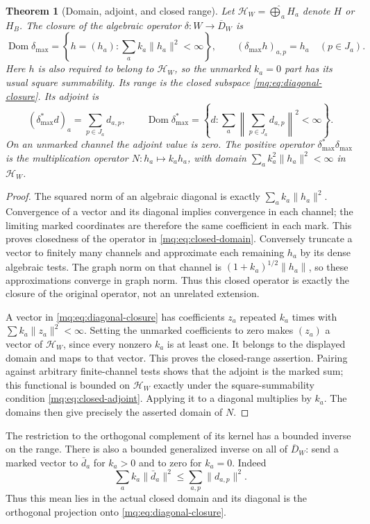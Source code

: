 \documentclass[11pt,a4paper]{article}
\newtheorem{theorem}{Theorem}[section]
\theoremstyle{definition}\newtheorem{definition}[theorem]{Definition}
\providecommand{\Dom}{\operatorname{Dom}}
\begin{document}
\begin{theorem}[Domain, adjoint, and closed range]
\label{mq:thm:closed-diagonal}
Let $\mathscr H_W=\widehat\bigoplus_aH_a$ denote $H$ or $H_B$.
The closure of the algebraic operator $\delta:W\to\overline D_W$
is
\[
 \Dom\delta_{\max}=
 \left\{h=(h_a):\sum_a k_a\|h_a\|^2<\infty\right\},
 \qquad(\delta_{\max}h)_{a,p}=h_a\quad(p\in J_a).
 \tag{MQ20}\label{mq:eq:closed-domain}
\]
Here $h$ is also required to belong to $\mathscr H_W$, so the
unmarked $k_a=0$ part has its usual square summability. Its range
is the closed subspace \eqref{mq:eq:diagonal-closure}. Its adjoint is
\[
 (\delta_{\max}^*d)_a=\sum_{p\in J_a}d_{a,p},\qquad
 \Dom\delta_{\max}^*=
 \left\{d:\sum_a\left\|\sum_{p\in J_a}d_{a,p}\right\|^2
                         <\infty\right\}.
 \tag{MQ21}\label{mq:eq:closed-adjoint}
\]
On an unmarked channel the adjoint value is zero. The positive
operator $\delta_{\max}^*\delta_{\max}$ is the multiplication
operator $N:h_a\mapsto k_ah_a$, with domain
$\sum_a k_a^2\|h_a\|^2<\infty$ in $\mathscr H_W$.
\end{theorem}
\begin{proof}
The squared norm of an algebraic diagonal is exactly
$\sum_a k_a\|h_a\|^2$. Convergence of a vector and its diagonal
implies convergence in each channel; the limiting marked
coordinates are therefore the same coefficient in each mark.
This proves closedness of the operator in
\eqref{mq:eq:closed-domain}. Conversely truncate a vector to finitely
many channels and approximate each remaining $h_a$ by its dense
algebraic tests. The graph norm on that channel is
$(1+k_a)^{1/2}\|h_a\|$, so these approximations converge in
graph norm. Thus this closed operator is exactly the closure of
the original operator, not an unrelated extension.

A vector in \eqref{mq:eq:diagonal-closure} has coefficients $z_a$
repeated $k_a$ times with $\sum k_a\|z_a\|^2<\infty$. Setting
the unmarked coefficients to zero makes $(z_a)$ a vector of
$\mathscr H_W$, since every nonzero $k_a$ is at least one.
It belongs to the displayed domain and maps to that vector.
This proves the closed-range assertion. Pairing against arbitrary
finite-channel tests shows that the adjoint is the marked sum;
this functional is bounded on $\mathscr H_W$ exactly under the
square-summability condition \eqref{mq:eq:closed-adjoint}. Applying
it to a diagonal multiplies by $k_a$. The domains then give
precisely the asserted domain of $N$.
\end{proof}

The restriction to the orthogonal complement of its kernel has a
bounded inverse on the range. There is also a bounded generalized
inverse on all of $\overline D_W$: send a marked vector to
$\bar d_a$ for $k_a>0$ and to zero for $k_a=0$. Indeed
\[
 \sum_a k_a\|\bar d_a\|^2\le\sum_{a,p}\|d_{a,p}\|^2.
 \tag{MQ22}\label{mq:eq:mean-bound}
\]
Thus this mean lies in the actual closed domain and its diagonal
is the orthogonal projection onto \eqref{mq:eq:diagonal-closure}.
\end{document}
